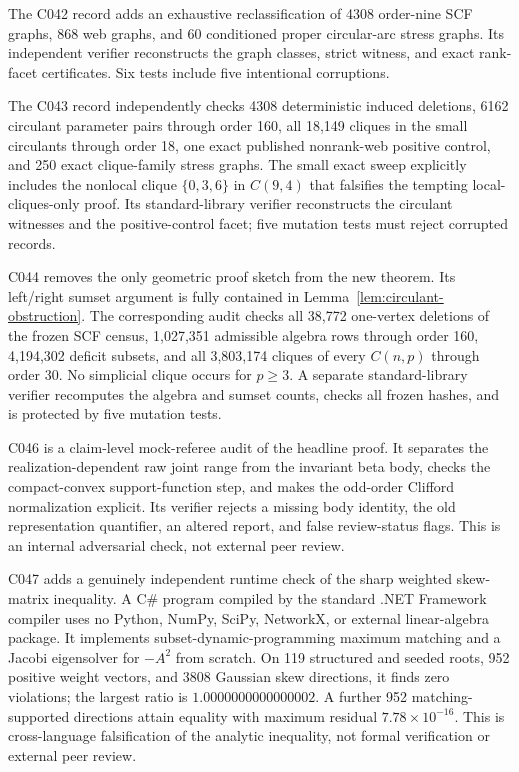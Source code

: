 \documentclass[11pt,a4paper]{article}
\theoremstyle{remark}
\begin{document}
The C042 record adds an exhaustive reclassification of 4308 order-nine SCF
graphs, 868 web graphs, and 60 conditioned proper circular-arc stress graphs.
Its independent verifier reconstructs the graph classes, strict witness, and
exact rank-facet certificates. Six tests include five intentional corruptions.

The C043 record independently checks 4308 deterministic induced deletions,
6162 circulant parameter pairs through order 160, all 18,149 cliques in the
small circulants through order 18, one exact published nonrank-web positive
control, and 250 exact clique-family stress graphs. The small exact sweep
explicitly includes the nonlocal clique $\{0,3,6\}$ in $C(9,4)$ that falsifies
the tempting local-cliques-only proof. Its standard-library verifier
reconstructs the circulant witnesses and the positive-control facet; five
mutation tests must reject corrupted records.

C044 removes the only geometric proof sketch from the new theorem. Its
left/right sumset argument is fully contained in Lemma~\ref{lem:circulant-obstruction}.
The corresponding audit checks all 38,772 one-vertex deletions of the frozen
SCF census, 1,027,351 admissible algebra rows through order 160, 4,194,302
deficit subsets, and all 3,803,174 cliques of every $C(n,p)$ through order 30.
No simplicial clique occurs for $p\geq3$. A separate standard-library verifier
recomputes the algebra and sumset counts, checks all frozen hashes, and is
protected by five mutation tests.

C046 is a claim-level mock-referee audit of the headline proof. It separates
the realization-dependent raw joint range from the invariant beta body,
checks the compact-convex support-function step, and makes the odd-order
Clifford normalization explicit. Its verifier rejects a missing body identity,
the old representation quantifier, an altered report, and false review-status
flags. This is an internal adversarial check, not external peer review.

C047 adds a genuinely independent runtime check of the sharp weighted
skew-matrix inequality. A C\# program compiled by the standard .NET Framework
compiler uses no Python, NumPy, SciPy, NetworkX, or external linear-algebra
package. It implements subset-dynamic-programming maximum matching and a
Jacobi eigensolver for $-A^2$ from scratch. On 119 structured and seeded roots,
952 positive weight vectors, and 3808 Gaussian skew directions, it finds zero
violations; the largest ratio is $1.0000000000000002$. A further 952
matching-supported directions attain equality with maximum residual
$7.78\times10^{-16}$. This is cross-language falsification of the analytic
inequality, not formal verification or external peer review.
\end{document}
